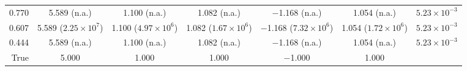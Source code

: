 \begin{tabular}{rcccccc}
0.770 & 5.589 (n.a.) & 1.100 (n.a.) & 1.082 (n.a.) & $-$1.168 (n.a.) & 1.054 (n.a.) & $5.23\times10^{-3}$ \\
0.607 & 5.589 ($2.25\times10^{7}$) & 1.100 ($4.97\times10^{6}$) & 1.082 ($1.67\times10^{6}$) & $-$1.168 ($7.32\times10^{6}$) & 1.054 ($1.72\times10^{6}$) & $5.23\times10^{-3}$ \\
0.444 & 5.589 (n.a.) & 1.100 (n.a.) & 1.082 (n.a.) & $-$1.168 (n.a.) & 1.054 (n.a.) & $5.23\times10^{-3}$ \\
\midrule
True & 5.000 & 1.000 & 1.000 & $-$1.000 & 1.000 &  \\
\bottomrule
\end{tabular}
